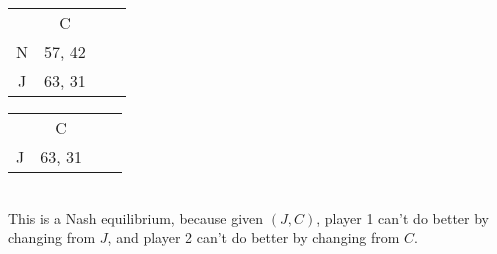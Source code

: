 \documentclass[12pt]{article}
\begin{document}
\begin{tabular}{cccc}
    {}   & C      \\
    N    & 57, 42 \\
    J    & 63, 31 \\
\end{tabular} \vspace{5mm}

\begin{tabular}{cccc}
    {}   & C      \\
    J    & 63, 31 \\
\end{tabular} \vspace{5mm} \\

This is a Nash equilibrium, because given $(J,C)$, player 1 can't do better by changing from $J$, and player 2 can't do
better by changing from $C$.

\problem

\problemsub

\problemsub

\problemsub

\problemsub

\problemsub

\problemsub

\problemsub

\problemsub

\problemsub

\problemsub

\problemsub
\end{document}
